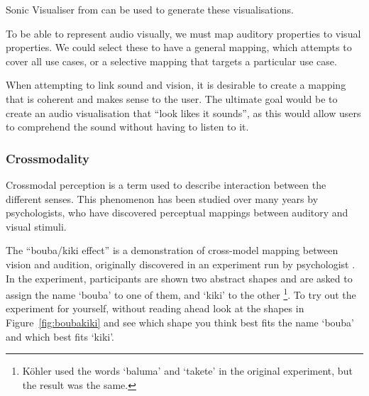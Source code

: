 Sonic Visualiser from \citet{Cannam2010} can be used to generate these visualisations.

To be able to represent audio visually, we must map auditory properties to visual properties. We could select these 
to have a general mapping, which attempts to cover all use cases, or a selective mapping that targets a particular use
case.

When attempting to link sound and vision, it is desirable to create a mapping that is coherent and makes sense to the
user. The ultimate goal would be to create an audio visualisation that ``look likes it sounds'', as this would
allow users to comprehend the sound without having to listen to it.




\subsubsection{Crossmodality}
Crossmodal perception is a term used to describe interaction between the different senses. This phenomenon has been
studied over many years by psychologists, who have discovered perceptual mappings between auditory and visual stimuli.

The ``bouba/kiki effect'' is a demonstration of cross-model mapping between vision and audition, originally discovered
in an experiment run by psychologist \citet{Koehler1929}. In the experiment, participants are shown two abstract shapes
and are asked to assign the name `bouba' to one of them, and `kiki' to the other \footnote{K\"ohler used the words
  `baluma' and `takete' in the original experiment, but the result was the same.}. To try out the experiment for
yourself, without reading ahead look at the shapes in Figure~\ref{fig:boubakiki} and see which shape you think best
fits the name `bouba' and which best fits `kiki'.


